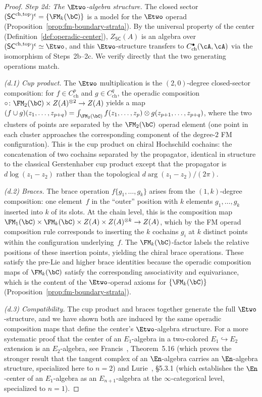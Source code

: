\begin{proof}
\emph{Step 2d: The $\Etwo$-algebra structure.}
The closed sector
$(\mathsf{SC}^{\mathrm{ch,top}})^{\mathsf{c}} = \{\FM_k(\bC)\}$ is
a model for the $\Etwo$ operad
(Proposition~\ref{prop:fm-boundary-strata}). By the universal
property of the center
(Definition~\ref{def:operadic-center}), $Z_{\mathsf{SC}}(A)$ is an
algebra over
$(\mathsf{SC}^{\mathrm{ch,top}})^{\mathsf{c}} \simeq \Etwo$, and
this $\Etwo$-structure transfers to
$C^{\bullet}_{\mathrm{ch}}(\cA, \cA)$ via the isomorphism of
Steps~2b--2c. We verify directly that the two generating operations
match.

\emph{(d.1) Cup product.}
The $\Etwo$ multiplication is the $(2,0)$-degree closed-sector
composition: for $f \in C^p_{\mathrm{ch}}$ and
$g \in C^q_{\mathrm{ch}}$, the operadic composition
$\circ\colon \FM_2(\bC) \times Z(A)^{\otimes 2} \to Z(A)$
yields a map
$(f \cup g)(z_1, \ldots, z_{p+q})
= \int_{\FM_2(\bC)}
f(z_1, \ldots, z_p) \otimes g(z_{p+1}, \ldots, z_{p+q})$,
where the two clusters of points are separated by the
$\FM_2(\bC)$ operad element (one point in each cluster
approaches the corresponding component of the degree-$2$ FM
configuration). This is the cup product on chiral Hochschild
cochains: the concatenation of two cochains separated by the
propagator, identical in structure to the classical
Gerstenhaber cup product except that the propagator is
$d\log(z_1 - z_2)$ rather than the topological
$d\arg(z_1 - z_2)/(2\pi)$.

\emph{(d.2) Braces.}
The brace operation $f\{g_1, \ldots, g_k\}$ arises from the
$(1, k)$-degree composition: one element~$f$ in the ``outer''
position with $k$ elements $g_1, \ldots, g_k$ inserted into $k$
of its slots. At the chain level, this is the composition map
$\FM_1(\bC) \times \FM_k(\bC) \times Z(A) \times Z(A)^{\otimes k}
\to Z(A)$,
which by the FM operad composition rule corresponds to
inserting the $k$ cochains $g_i$ at $k$ distinct points within
the configuration underlying~$f$. The $\FM_k(\bC)$-factor
labels the relative positions of these insertion points,
yielding the chiral brace operations. These satisfy the
pre-Lie and higher brace identities because the operadic
composition maps of $\FM_k(\bC)$ satisfy the corresponding
associativity and equivariance, which is the content of
the $\Etwo$-operad axioms for $\{\FM_k(\bC)\}$
(Proposition~\ref{prop:fm-boundary-strata}).

\emph{(d.3) Compatibility.}
The cup product and braces together generate the full
$\Etwo$-structure, and we have shown both are induced by the
same operadic composition maps that define the center's
$\Etwo$-algebra structure. For a more systematic proof that
the center of an $E_1$-algebra in a two-colored
$E_1 \hookrightarrow E_2$ extension is an $E_2$-algebra, see
Francis~\cite{Francis2013}, Theorem~5.16 (which proves the
stronger result that the tangent complex of an $\En$-algebra
carries an $\En$-algebra structure, specialized here to $n = 2$)
and Lurie~\cite{HA}, \S5.3.1 (which establishes the $\En$-center
of an $E_1$-algebra as an $E_{n+1}$-algebra at the
$\infty$-categorical level, specialized to $n = 1$).
\end{proof}

